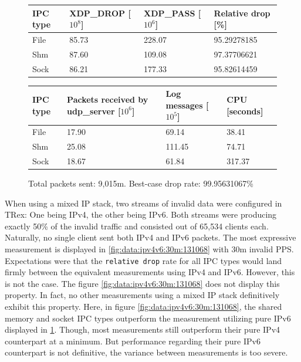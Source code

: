 \begin{figure}[!h]
	\centering
	\scriptsize
	\begin{tabular}{llll}
		\toprule
		\textbf{IPC type} & \textbf{XDP\_DROP [$10^8$]} & \textbf{XDP\_PASS [$10^6$]} & \textbf{Relative drop [\%]} \\ \midrule 
		File & 85.73 & 228.07 & 95.29278185 \\
        Shm & 87.60 & 109.08 & 97.37706621 \\
        Sock & 86.21 & 177.33 & 95.82614459 \\
	\bottomrule
	\end{tabular}
    \begin{tabular}{llll}
		\toprule
		\textbf{IPC type} & \textbf{Packets received by udp\_server [$10^6$]} & \textbf{Log messages [$10^5$]} & \textbf{CPU [seconds]} \\ \midrule 
		File & 17.90 & 69.14 & 38.41 \\
        Shm & 25.08 & 111.45 & 74.71 \\
        Sock & 18.67 & 61.84 & 317.37 \\
	\bottomrule
	\end{tabular}
	\caption[Simplefail2ban, IPv6, 30m \ac{PPS}, 131,068 malicious clients]{Total packets sent: 9,015m. Best-case drop rate: 99.95631067\%}
	\label{fig:data:ipv6:30m:131068}
\end{figure}

When using a mixed \ac{IP} stack, two streams of invalid data were configured in TRex: One being IPv4, the other being IPv6.
Both streams were producing exactly 50\% of the invalid traffic and consisted out of 65,534 clients each.
Naturally, no single client sent both IPv4 and IPv6 packets.
The most expressive measurement is displayed in \ref{fig:data:ipv4v6:30m:131068} with 30m invalid \ac{PPS}.
Expectations were that the \texttt{relative drop} rate for all \ac{IPC} types would land firmly between the equivalent measurements using IPv4 and IPv6.
However, this is not the case.
The figure \ref{fig:data:ipv4v6:30m:131068} does not display this property.
In fact, no other measurements using a mixed \ac{IP} stack definitively exhibit this property.
Here, in figure \ref{fig:data:ipv4v6:30m:131068}, the shared memory and socket \ac{IPC} types outperform the measurement utilizing pure IPv6 displayed in \ref{fig:data:ipv6:30m:131068}.
Though, most measurements still outperform their pure IPv4 counterpart at a minimum.
But performance regarding their pure IPv6 counterpart is not definitive, the variance between measurements is too severe.

